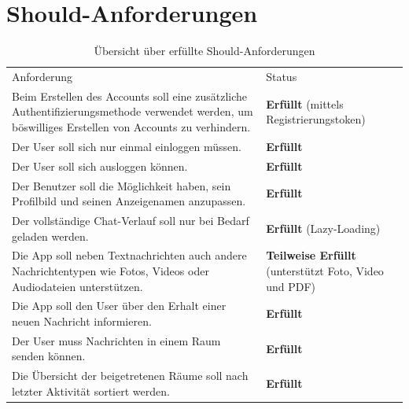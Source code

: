     \newpage
    \section{Should-Anforderungen}\label{sec:should-anforderungen}
    \begin{table}[h]
        \centering
        \begin{tabular}{p{}|p{}}
            Anforderung & Status\\
            \cline{1-2}
            Beim Erstellen des Accounts soll eine zusätzliche Authentifizierungsmethode verwendet werden, um böswilliges Erstellen von Accounts zu verhindern.
            &  \textbf{Erfüllt} (mittels Registrierungstoken)\\
            \cline{1-2}
            Der User soll sich nur einmal einloggen müssen. &  \textbf{Erfüllt} \\
            \cline{1-2}
            Der User soll sich ausloggen können. & \textbf{Erfüllt}  \\
            \cline{1-2}
            Der Benutzer soll die Möglichkeit haben, sein Profilbild und seinen Anzeigenamen anzupassen. &  \textbf{Erfüllt} \\
            \cline{1-2}
            Der vollständige Chat-Verlauf soll nur bei Bedarf geladen werden. & \textbf{Erfüllt} (Lazy-Loading)\\
            \cline{1-2}
            Die App soll neben Textnachrichten auch andere Nachrichtentypen wie Fotos, Videos oder Audiodateien unterstützen. & \textbf{Teilweise Erfüllt} (unterstützt Foto, Video und PDF) \\
            \cline{1-2}
            Die App soll den User über den Erhalt einer neuen Nachricht informieren. & \textbf{Erfüllt} \\
            \cline{1-2}
            Der User muss Nachrichten in einem Raum senden können. & \textbf{Erfüllt} \\
            \cline{1-2}
            Die Übersicht der beigetretenen Räume soll nach letzter Aktivität sortiert werden. & \textbf{Erfüllt}
        \end{tabular}
        \caption{Übersicht über erfüllte Should-Anforderungen}
        \label{tab:erfüllte-should-anforderungen}
    \end{table}

    \newpage

